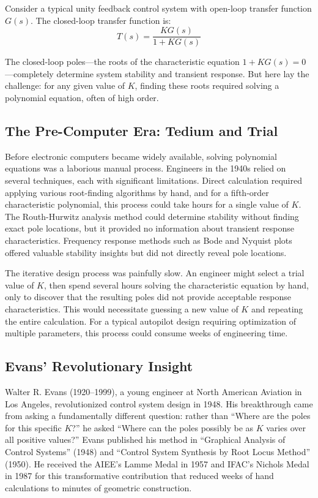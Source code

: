 Consider a typical unity feedback control system with open-loop transfer function $G(s)$. The closed-loop transfer function is:
\begin{equation}
T(s) = \frac{KG(s)}{1 + KG(s)}
\label{eq:closed_loop}
\end{equation}

The closed-loop poles---the roots of the characteristic equation $1 + KG(s) = 0$---completely determine system stability and transient response. But here lay the challenge: for any given value of $K$, finding these roots required solving a polynomial equation, often of high order.

\subsection{The Pre-Computer Era: Tedium and Trial}

Before electronic computers became widely available, solving polynomial equations was a laborious manual process. Engineers in the 1940s relied on several techniques, each with significant limitations. Direct calculation required applying various root-finding algorithms by hand, and for a fifth-order characteristic polynomial, this process could take hours for a single value of $K$. The Routh-Hurwitz analysis method could determine stability without finding exact pole locations, but it provided no information about transient response characteristics. Frequency response methods such as Bode and Nyquist plots offered valuable stability insights but did not directly reveal pole locations.

The iterative design process was painfully slow. An engineer might select a trial value of $K$, then spend several hours solving the characteristic equation by hand, only to discover that the resulting poles did not provide acceptable response characteristics. This would necessitate guessing a new value of $K$ and repeating the entire calculation. For a typical autopilot design requiring optimization of multiple parameters, this process could consume weeks of engineering time.

\subsection{Evans' Revolutionary Insight}

\begin{historicalbox}
Walter R. Evans (1920--1999), a young engineer at North American Aviation in Los Angeles, revolutionized control system design in 1948. His breakthrough came from asking a fundamentally different question: rather than ``Where are the poles for this specific $K$?'' he asked ``Where can the poles possibly be as $K$ varies over all positive values?'' Evans published his method in ``Graphical Analysis of Control Systems'' (1948) and ``Control System Synthesis by Root Locus Method'' (1950). He received the AIEE's Lamme Medal in 1957 and IFAC's Nichols Medal in 1987 for this transformative contribution that reduced weeks of hand calculations to minutes of geometric construction.
\end{historicalbox}

